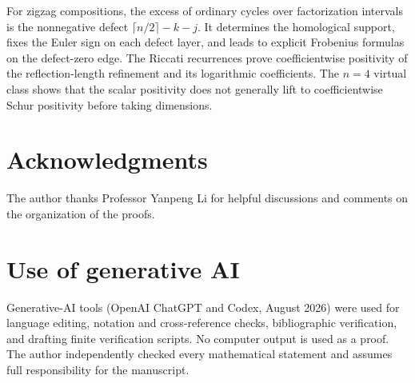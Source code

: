 \documentclass{amsart}
\theoremstyle{definition}
\theoremstyle{remark}
\begin{document}
For zigzag compositions, the excess of ordinary cycles over factorization
intervals is the nonnegative defect
$\lceil n/2\rceil-k-j$.  It determines the homological support, fixes the Euler
sign on each defect layer, and leads to explicit Frobenius formulas on the
defect-zero edge.  The Riccati recurrences prove coefficientwise positivity
of the reflection-length refinement and its logarithmic coefficients.  The
$n=4$ virtual class shows that the scalar positivity does not generally lift
to coefficientwise Schur positivity before taking dimensions.

\section*{Acknowledgments}
The author thanks Professor Yanpeng Li for helpful discussions and comments on
the organization of the proofs.

\section*{Use of generative AI}
Generative-AI tools (OpenAI ChatGPT and Codex, August 2026) were used for
language editing, notation and cross-reference checks, bibliographic
verification, and drafting finite verification scripts.  No computer output
is used as a proof.  The author independently checked every mathematical
statement and assumes full responsibility for the manuscript.



\end{document}
